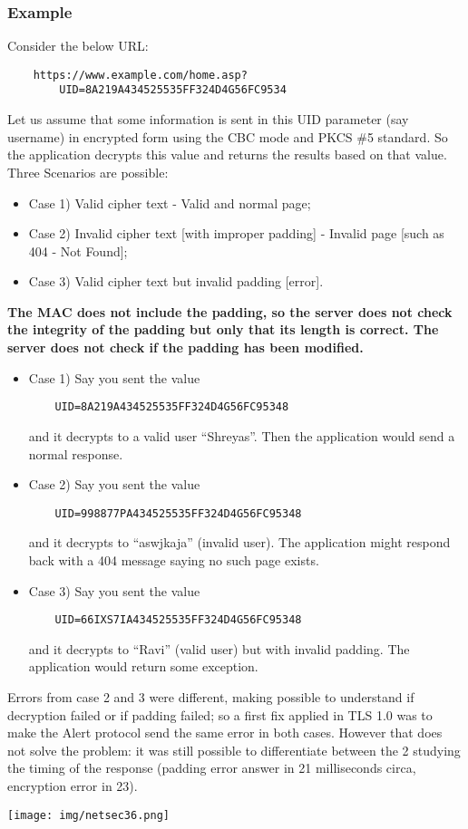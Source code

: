 \documentclass[a4paper, 10pt, titlepage]{article}
\begin{document}
\subsubsection*{Example}
Consider the below URL:
\begin{lstlisting}
	https://www.example.com/home.asp?
		UID=8A219A434525535FF324D4G56FC9534
\end{lstlisting}
Let us assume that some information is sent in this UID parameter (say username) in encrypted form using the CBC mode and PKCS \#5 standard. So the application decrypts this value and returns the results based on that value. Three Scenarios are possible:
\begin{itemize}
	\item Case 1) Valid cipher text - Valid and normal page;
	\item Case 2) Invalid cipher text [with improper padding] - Invalid page [such as 404 - Not Found];
	\item Case 3) Valid cipher text but invalid padding [error].
\end{itemize}
\textbf{The MAC does not include the padding, so the server does not check the integrity of the padding but only that its length is correct. The server does not check if the padding has been modified.}
\begin{itemize}
	\item Case 1) Say you sent the value
	\begin{lstlisting}
	UID=8A219A434525535FF324D4G56FC95348
	\end{lstlisting}
	and it decrypts to a valid user “Shreyas”. Then the application would send a normal response.
	\item Case 2) Say you sent the value
	\begin{lstlisting}
	UID=998877PA434525535FF324D4G56FC95348
	\end{lstlisting}
	and it decrypts to “aswjkaja” (invalid user). The application might respond back with a 404 message saying no such page exists.
	\item Case 3) Say you sent the value
	\begin{lstlisting}
	UID=66IXS7IA434525535FF324D4G56FC95348
	\end{lstlisting}
	and it decrypts to “Ravi” (valid user) but with invalid padding. The application would return some exception.
\end{itemize}
Errors from case 2 and 3 were different, making possible to understand if decryption failed or if padding failed; so a first fix applied in TLS 1.0 was to make the Alert protocol send the same error in both cases. However that does not solve the problem: it was still possible to differentiate between the 2 studying the timing of the response (padding error answer in 21 milliseconds circa, encryption error in 23). 
\begin{center}
	\texttt{[image: img/netsec36.png]}
\end{center}
\end{document}
